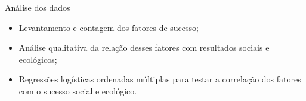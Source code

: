 \begin{frame}{Análise dos dados}

\begin{itemize}
    \item Levantamento e contagem dos fatores de sucesso;
    \item Análise qualitativa da relação desses fatores com resultados sociais e ecológicos;
    \item Regressões logísticas ordenadas múltiplas para testar a correlação dos fatores com o sucesso social e ecológico.
\end{itemize}
\end{frame}